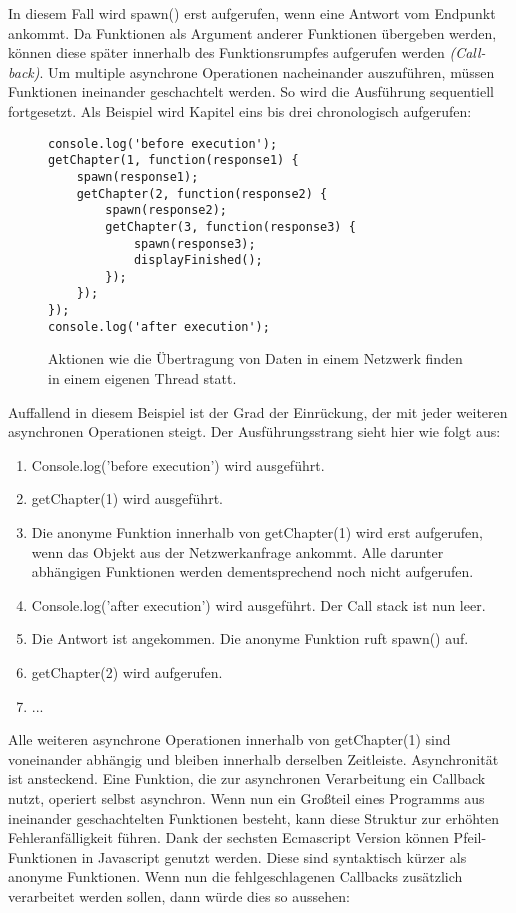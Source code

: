 \noindent
In diesem Fall wird spawn() erst aufgerufen, wenn eine Antwort vom Endpunkt ankommt. Da Funktionen als Argument anderer Funktionen übergeben werden, können diese \glqq{}später\grqq{} innerhalb des Funktionsrumpfes aufgerufen werden \textit{(\glqq{}Call-back\grqq{})}. Um multiple asynchrone Operationen nacheinander auszuführen, müssen Funktionen ineinander geschachtelt werden. So wird die Ausführung sequentiell fortgesetzt. Als Beispiel wird Kapitel eins bis drei chronologisch aufgerufen:

\begin{figure}[H]
\begin{lstlisting}[basicstyle=\small]
console.log('before execution');
getChapter(1, function(response1) {
    spawn(response1);
    getChapter(2, function(response2) {
        spawn(response2);
        getChapter(3, function(response3) {
            spawn(response3);
            displayFinished();
        });
    });
});
console.log('after execution');
\end{lstlisting}
\caption{Aktionen wie die Übertragung von Daten in einem Netzwerk finden in einem eigenen Thread statt.}
\end{figure}

\noindent
Auffallend in diesem Beispiel ist der Grad der Einrückung, der mit jeder weiteren asynchronen Operationen steigt. Der Ausführungsstrang sieht hier wie folgt aus:

\begin{enumerate}
    \item Console.log('before execution') wird ausgeführt.
    \item getChapter(1) wird ausgeführt.
    \item Die anonyme Funktion innerhalb von getChapter(1) wird erst aufgerufen, wenn das Objekt aus der Netzwerkanfrage ankommt. Alle darunter abhängigen Funktionen werden dementsprechend noch nicht aufgerufen.
    \item Console.log('after execution') wird ausgeführt. Der Call stack ist nun leer.
    \item Die Antwort ist angekommen. Die anonyme Funktion ruft spawn() auf.
    \item getChapter(2) wird aufgerufen.
    \item ...
\end{enumerate}

\noindent
Alle weiteren asynchrone Operationen innerhalb von getChapter(1) sind voneinander abhängig und bleiben innerhalb derselben Zeitleiste. Asynchronität ist ansteckend. Eine Funktion, die zur asynchronen Verarbeitung ein Callback nutzt, operiert selbst asynchron. Wenn nun ein Großteil eines Programms aus ineinander geschachtelten Funktionen besteht, kann diese Struktur zur erhöhten Fehleranfälligkeit führen. Dank der sechsten Ecmascript Version können Pfeil-Funktionen in Javascript genutzt werden. Diese sind syntaktisch kürzer als anonyme Funktionen. Wenn nun die fehlgeschlagenen Callbacks zusätzlich verarbeitet werden sollen, dann würde dies so aussehen:

